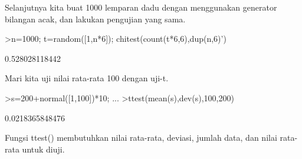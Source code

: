 \documentclass[a4paper,10pt]{article}
\begin{document}
\begin{eulernotebook}
\begin{eulercomment}
\begin{eulercomment}
\begin{eulercomment}
\begin{eulercomment}
\begin{eulercomment}
Selanjutnya kita buat 1000 lemparan dadu dengan menggunakan generator
bilangan acak, dan lakukan pengujian yang sama.
\end{eulercomment}
\begin{eulerprompt}
>n=1000; t=random([1,n*6]); chitest(count(t*6,6),dup(n,6)')
\end{eulerprompt}
\begin{euleroutput}
  0.528028118442
\end{euleroutput}
\begin{eulercomment}
Mari kita uji nilai rata-rata 100 dengan uji-t.
\end{eulercomment}
\begin{eulerprompt}
>s=200+normal([1,100])*10; ...
>ttest(mean(s),dev(s),100,200)
\end{eulerprompt}
\begin{euleroutput}
  0.0218365848476
\end{euleroutput}
\begin{eulercomment}
Fungsi ttest() membutuhkan nilai rata-rata, deviasi, jumlah data, dan
nilai rata-rata untuk diuji.


\end{eulercomment}
\end{eulercomment}
\end{eulercomment}
\end{eulercomment}
\end{eulercomment}
\end{eulernotebook}
\end{document}
